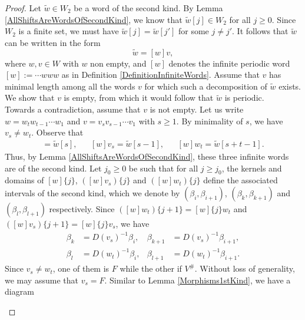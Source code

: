 \documentclass[12pt]{amsart}
\theoremstyle{definition}
\renewcommand{\tilde}{\widetilde}
\newcommand{\<}{\langle}   %
\renewcommand{\>}{\rangle} %
\begin{document}
\begin{proof}
    Let $\tilde w \in W_2$ be a word of the second kind. By Lemma \ref{AllShiftsAreWordsOfSecondKind}, we know that $\tilde w[j] \in W_2$ for all $j \geq 0$. Since $W_2$ is a finite set, we must have $\tilde w[j] = \tilde w[j']$ for some $j \not = j'$. It follows that $\tilde w$ can be written in the form
    \begin{equation*}
        \tilde w = [w]v,
    \end{equation*}
    where $w,v \in W$ with $w$ non empty, and $[w]$ denotes the infinite periodic word $[w] := \cdots www$ as in Definition \ref{DefinitionInfiniteWords}. Assume that $v$ has minimal length among all the words $v$ for which such a decomposition of $\tilde w$ exists. We show that $v$ is empty, from which it would follow that $\tilde w$ is periodic.\\
    Towards a contradiction, assume that $v$ is not empty. Let us write $w = w_tw_{t-1}\cdots w_1$ and $v = v_sv_{s-1}\cdots v_1$ with $s\geq 1$. By minimality of $s$, we have $v_s \not = w_t$. Observe that
    \begin{align*}
        [w] = \tilde w[s], & & [w]v_s = \tilde w[s-1], & & [w]w_t = \tilde w[s+t-1].
    \end{align*}
    Thus, by Lemma \ref{AllShiftsAreWordsOfSecondKind}, these three infinite words are of the second kind. Let $j_0 \geq 0$ be such that for all $j \geq j_0$, the kernels and domains of $[w]\{j\}$, $([w]v_s)\{j\}$ and $([w]w_t)\{j\}$ define the associated intervals of the second kind, which we denote by $(\beta_i,\beta_{i+1})$, $(\beta_{k},\beta_{k+1})$ and $(\beta_{l},\beta_{l+1})$ respectively. Since $([w]w_t)\{j+1\} = [w]\{j\}w_t$ and $([w]v_s)\{j+1\} = [w]\{j\}v_s$, we have 
    \begin{align*}
        \beta_k & = D(v_s)^{-1}\beta_i, & \beta_{k+1} & = D(v_s)^{-1}\beta_{i+1},\\
        \beta_l & = D(w_t)^{-1}\beta_i, & \beta_{l+1} & = D(w_t)^{-1}\beta_{i+1}.
    \end{align*}
    Since $v_s \not = w_t$, one of them is $F$ while the other if $V^{\#}$. Without loss of generality, we may assume that $v_s = F$. Similar to Lemma \ref{Morphisms1stKind}, we have a diagram 
    \begin{center}
\end{center}
\end{proof}
\end{document}
